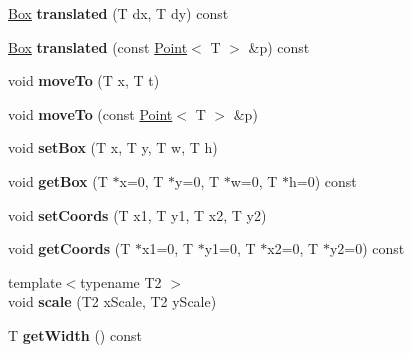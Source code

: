 \begin{DoxyCompactItemize}
\item 
\hypertarget{class_box_a435e394b453a84f5c82f4163652dfb50}{
\hyperlink{class_box}{Box} {\bfseries translated} (T dx, T dy) const }
\label{class_box_a435e394b453a84f5c82f4163652dfb50}

\item 
\hypertarget{class_box_ac441f74500a5f381dd80639c683cfe7e}{
\hyperlink{class_box}{Box} {\bfseries translated} (const \hyperlink{class_point}{Point}$<$ T $>$ \&p) const }
\label{class_box_ac441f74500a5f381dd80639c683cfe7e}

\item 
\hypertarget{class_box_a484604d7fec04732de90ea55da3b7b6a}{
void {\bfseries moveTo} (T x, T t)}
\label{class_box_a484604d7fec04732de90ea55da3b7b6a}

\item 
\hypertarget{class_box_a3c7f973d21b9144b2b1d5a854f2aec9b}{
void {\bfseries moveTo} (const \hyperlink{class_point}{Point}$<$ T $>$ \&p)}
\label{class_box_a3c7f973d21b9144b2b1d5a854f2aec9b}

\item 
\hypertarget{class_box_a58b4172de656a853e63734c8501ca2d3}{
void {\bfseries setBox} (T x, T y, T w, T h)}
\label{class_box_a58b4172de656a853e63734c8501ca2d3}

\item 
\hypertarget{class_box_a2a5767d016fc9a5960f3e2a3c9fa5c89}{
void {\bfseries getBox} (T $\ast$x=0, T $\ast$y=0, T $\ast$w=0, T $\ast$h=0) const }
\label{class_box_a2a5767d016fc9a5960f3e2a3c9fa5c89}

\item 
\hypertarget{class_box_a34c9185bc13058d287f762f70a44738b}{
void {\bfseries setCoords} (T x1, T y1, T x2, T y2)}
\label{class_box_a34c9185bc13058d287f762f70a44738b}

\item 
\hypertarget{class_box_a08182031d00233aa02f6b9380d213c86}{
void {\bfseries getCoords} (T $\ast$x1=0, T $\ast$y1=0, T $\ast$x2=0, T $\ast$y2=0) const }
\label{class_box_a08182031d00233aa02f6b9380d213c86}

\item 
\hypertarget{class_box_a710290e5022b29be36491593d26e938d}{
{\footnotesize template$<$typename T2 $>$ }\\void {\bfseries scale} (T2 xScale, T2 yScale)}
\label{class_box_a710290e5022b29be36491593d26e938d}

\item 
\hypertarget{class_box_a25420c9b205a53b1345ff2dce6d2f351}{
T {\bfseries getWidth} () const }
\label{class_box_a25420c9b205a53b1345ff2dce6d2f351}


\end{DoxyCompactItemize}
